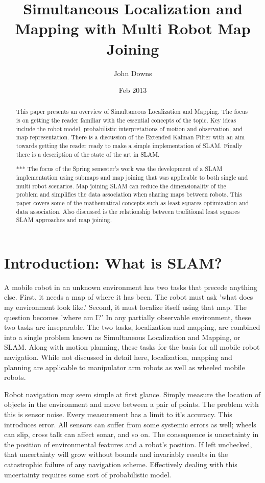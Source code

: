 \documentclass[12pt]{report}
\title{Simultaneous Localization and Mapping with Multi Robot Map Joining}
\author{John Downs}
\date{Feb 2013}
\begin{document}
\maketitle
\tableofcontents 


\begin{abstract}
This paper presents an overview of Simultaneous Localization and Mapping.  The focus is on getting the reader familiar with the essential concepts of the topic.  Key ideas include the robot model, probabilistic interpretations of motion and observation, and map representation.  There is a discussion of the Extended Kalman Filter with an aim towards getting the reader ready to make a simple implementation of SLAM.  Finally there is a description of the state of the art in SLAM.

***
The focus of the Spring semester's work was the development of a SLAM implementation using submaps and map joining that was applicable to both single and multi robot scenarios.  Map joining SLAM can reduce the dimensionality of the problem and simplifies the data association when sharing maps between robots.  This paper covers some of the mathematical concepts such as least squares optimization and data association.  Also discussed is the relationship between traditional least squares SLAM approaches and map joining.
\end{abstract}
 
 
\chapter{Introduction: What is SLAM?}

A mobile robot in an unknown environment has two tasks that precede anything else.  First, it needs a map of where it has been.  The robot must ask 'what does my environment look like.'  Second, it must localize itself using that map.  The question becomes 'where am I?'  In any partially observable environment, these two tasks are inseparable.  The two tasks, localization and mapping, are combined into a single problem known as Simultaneous Localization and Mapping, or SLAM.  Along with motion planning, these tasks for the basis for all mobile robot navigation.  While not discussed in detail here, localization, mapping and planning are applicable to manipulator arm robots as well as wheeled mobile robots.

Robot navigation may seem simple at first glance.  Simply measure the location of objects in the environment and move between a pair of points.  The problem with this is sensor noise.  Every measurement has a limit to it's accuracy.  This introduces error.  All sensors can suffer from some systemic errors as well; wheels can slip, cross talk can affect sonar, and so on.  The consequence is uncertainty in the position of environmental features and a robot's position.  If left unchecked, that uncertainty will grow without bounds and invariably results in the catastrophic failure of any navigation scheme.  Effectively dealing with this uncertainty requires some sort of probabilistic model.
\end{document}
